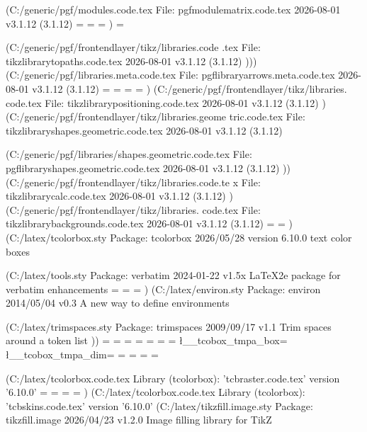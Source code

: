 (C:\MikTeX\tex/generic/pgf/modules\pgfmodulematrix.code.tex
File: pgfmodulematrix.code.tex 2026-08-01 v3.1.12 (3.1.12)
\pgfmatrixcurrentrow=
\pgfmatrixcurrentcolumn=
\pgf@matrix@numberofcolumns=
)
\tikz@expandcount=

(C:\MikTeX\tex/generic/pgf/frontendlayer/tikz/libraries\tikzlibrarytopaths.code
.tex
File: tikzlibrarytopaths.code.tex 2026-08-01 v3.1.12 (3.1.12)
))) (C:\MikTeX\tex/generic/pgf/libraries\pgflibraryarrows.meta.code.tex
File: pgflibraryarrows.meta.code.tex 2026-08-01 v3.1.12 (3.1.12)
\pgfarrowinset=
\pgfarrowlength=
\pgfarrowwidth=
\pgfarrowlinewidth=
)
(C:\MikTeX\tex/generic/pgf/frontendlayer/tikz/libraries\tikzlibrarypositioning.
code.tex
File: tikzlibrarypositioning.code.tex 2026-08-01 v3.1.12 (3.1.12)
)
(C:\MikTeX\tex/generic/pgf/frontendlayer/tikz/libraries\tikzlibraryshapes.geome
tric.code.tex
File: tikzlibraryshapes.geometric.code.tex 2026-08-01 v3.1.12 (3.1.12)

(C:\MikTeX\tex/generic/pgf/libraries/shapes\pgflibraryshapes.geometric.code.tex
File: pgflibraryshapes.geometric.code.tex 2026-08-01 v3.1.12 (3.1.12)
))
(C:\MikTeX\tex/generic/pgf/frontendlayer/tikz/libraries\tikzlibrarycalc.code.te
x
File: tikzlibrarycalc.code.tex 2026-08-01 v3.1.12 (3.1.12)
)
(C:\MikTeX\tex/generic/pgf/frontendlayer/tikz/libraries\tikzlibrarybackgrounds.
code.tex
File: tikzlibrarybackgrounds.code.tex 2026-08-01 v3.1.12 (3.1.12)
\pgf@layerbox@background=
\pgf@layerboxsaved@background=
) (C:\MikTeX\tex/latex/tcolorbox\tcolorbox.sty
Package: tcolorbox 2026/05/28 version 6.10.0 text color boxes

(C:\MikTeX\tex/latex/tools\verbatim.sty
Package: verbatim 2024-01-22 v1.5x LaTeX2e package for verbatim enhancements
\every@verbatim=
\verbatim@line=
\verbatim@in@stream=
)
(C:\MikTeX\tex/latex/environ\environ.sty
Package: environ 2014/05/04 v0.3 A new way to define environments

(C:\MikTeX\tex/latex/trimspaces\trimspaces.sty
Package: trimspaces 2009/09/17 v1.1 Trim spaces around a token list
))
\tcb@titlebox=
\tcb@upperbox=
\tcb@lowerbox=
\tcb@phantombox=
\c@tcbbreakpart=
\c@tcblayer=
\c@tcolorbox@number=
\l__tcobox_tmpa_box=
\l__tcobox_tmpa_dim=
\tcb@temp=
\tcb@temp=
\tcb@temp=
\tcb@temp=

(C:\MikTeX\tex/latex/tcolorbox\tcbraster.code.tex
Library (tcolorbox): 'tcbraster.code.tex' version '6.10.0'
\c@tcbrastercolumn=
\c@tcbrasterrow=
\c@tcbrasternum=
\c@tcbraster=
) (C:\MikTeX\tex/latex/tcolorbox\tcbskins.code.tex
Library (tcolorbox): 'tcbskins.code.tex' version '6.10.0'
(C:\MikTeX\tex/latex/tikzfill\tikzfill.image.sty
Package: tikzfill.image 2026/04/23 v1.2.0 Image filling library for TikZ

